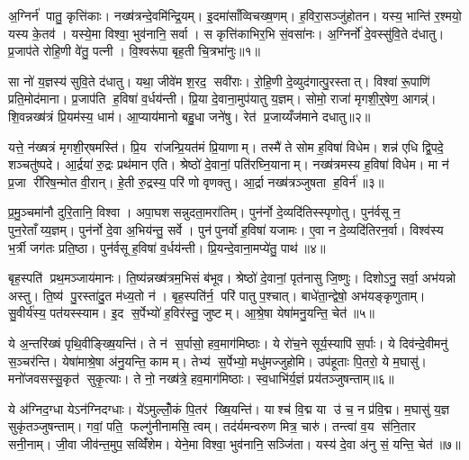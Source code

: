 \setcounter{anuvakam}{0}
अ॒ग्निर्न॑ पातु॒ कृत्ति॑काः। नख्ष॑त्रन्दे॒वमि॑न्द्रि॒यम्। इ॒दमा॑साँव्विचख्ष॒णम्। ह॒विरा॒सञ्जु॑होतन। यस्य॒ भान्ति॑ र॒श्मयो॒ यस्य के॒तव॑। यस्ये॒मा विश्वा॒ भुव॑नानि॒ सर्वा। स कृत्ति॑काभिर॒भि सं॒वसा॑नः। अ॒ग्निर्नो॑ दे॒वस्सु॑वि॒ते द॑धातु। प्र॒जाप॑ते रोहि॒णी वे॑तु॒ पत्नी। वि॒श्वरू॑पा बृह॒ती चि॒त्रभा॑नुः॥१॥

सा नो॑ य॒ज्ञस्य॑ सुवि॒ते द॑धातु। यथा॒ जीवे॑म श॒रद॒ सवी॑राः। रो॒हि॒णी दे॒व्युद॑गात्पु॒रस्तात्। विश्वा॑ रू॒पाणि॑ प्रति॒मोद॑माना। प्र॒जाप॑ति ह॒विषा॑ व॒र्धय॑न्ती। प्रि॒या दे॒वाना॒मुप॑यातु य॒ज्ञम्। सोमो॒ राजा॑ मृगशी॒र्॒षेण॒ आगन्न्॑। शि॒वन्नख्ष॑त्रं प्रि॒यम॑स्य॒ धाम॑। आ॒प्याय॑मानो बहु॒धा जने॑षु। रेत॑ प्र॒जाय्यँज॑माने दधातु॥२॥

यत्ते॒ न॑ख्षत्रं मृगशी॒र्‌षमस्ति॑। प्रि॒य रा॑जन्प्रि॒यत॑मं प्रि॒याणाम्। तस्मै॑ ते सोम ह॒विषा॑ विधेम। शन्न॑ एधि द्वि॒पदे॒ शञ्चतु॑ष्पदे। आ॒र्द्रया॑ रु॒द्रः प्रथ॑मान एति। श्रेष्ठो॑ दे॒वानां॒ पति॑रघ्नि॒यानाम्। नख्ष॑त्रमस्य ह॒विषा॑ विधेम। मा न॑ प्र॒जा री॑रिष॒न्मोत वी॒रान्। हे॒ती रु॒द्रस्य॒ परि॑ णो वृणक्तु। आ॒र्द्रा नख्ष॑त्रञ्जुषता ह॒विर्न॑॥३॥

प्र॒मु॒ञ्चमा॑नौ दुरि॒तानि॒ विश्वा। अपा॒घशसन्नुदता॒मरा॑तिम्। पुन॑र्नो दे॒व्यदि॑तिस्स्पृणोतु। पुन॑र्वसू न॒ पुन॒रेताँय्य॒ज्ञम्। पुन॑र्नो दे॒वा अ॒भिय॑न्तु॒ सर्वे। पुन॑पुनर्वो ह॒विषा॑ यजामः। ए॒वा न दे॒व्यदि॑तिरन॒र्वा। विश्व॑स्य भ॒र्त्री जग॑तः प्रति॒ष्ठा। पुन॑र्वसू ह॒विषा॑ व॒र्धय॑न्ती। प्रि॒यन्दे॒वाना॒मप्ये॑तु॒ पाथ॑॥४॥

बृह॒स्पति॑ प्रथ॒मञ्जाय॑मानः। ति॒ष्य॑न्नख्ष॑त्रम॒भिसं ब॑भूव। श्रेष्ठो॑ दे॒वानां॒ पृत॑नासु जि॒ष्णुः। दिशोऽनु॒ सर्वा॒ अभ॑यन्नो अस्तु। ति॒ष्य॑ पु॒रस्ता॑दु॒त म॑ध्य॒तो न॑। बृह॒स्पति॑र्न॒ परि॑ पातु प॒श्चात्। बाधे॑ता॒न्द्वेषो॒ अभ॑यङ्कृणुताम्। सु॒वीर्य॑स्य॒ पत॑यस्स्याम। इ॒द स॒र्पेभ्यो॑ ह॒विर॑स्तु॒ जुष्टम्। आ॒श्रे॒षा येषा॑मनु॒यन्ति॒ चेत॑॥५॥

ये अ॒न्तरि॑ख्षं पृथि॒वीङ्ख्षि॒यन्ति॑। ते न॑ स॒र्पासो॒ हव॒माग॑मिष्ठाः। ये रो॑च॒ने सूर्य॒स्यापि॑ स॒र्पाः। ये दिव॑न्दे॒वीमनु॑ स॒ञ्चर॑न्ति। येषा॑माश्रे॒षा अ॑नु॒यन्ति॒ कामम्। तेभ्य॑ स॒र्पेभ्यो॒ मधु॑मज्जुहोमि। उप॑हूताः पि॒तरो॒ ये म॒घासु॑। मनो॑जवसस्सु॒कृत॑ सुकृ॒त्याः। ते नो॒ नख्ष॑त्रे॒ हव॒माग॑मिष्ठाः। स्व॒धाभि॑र्य॒ज्ञं प्रय॑तञ्जुषन्ताम्॥६॥

ये अ॑ग्निद॒ग्धा येऽन॑ग्निदग्धाः। ये॑ऽमुल्लोँ॒कं पि॒तर॑ ख्षि॒यन्ति॑। याश्च॑ वि॒द्म या उ॑ च॒ न प्र॑वि॒द्म। म॒घासु॑ य॒ज्ञ सुकृ॑तञ्जुषन्ताम्। गवां॒ पति॒ फल्गु॑नीनामसि॒ त्वम्। तद॑र्यमन्वरुण मित्र॒ चारु॑। तन्त्वा॑ व॒य स॑नि॒तार सनी॒नाम्। जी॒वा जीव॑न्त॒मुप॒ सव्विँ॑शेम। येने॒मा विश्वा॒ भुव॑नानि॒ सञ्जि॑ता। यस्य॑ दे॒वा अ॑नु सं॒ यन्ति॒ चेत॑॥७॥


